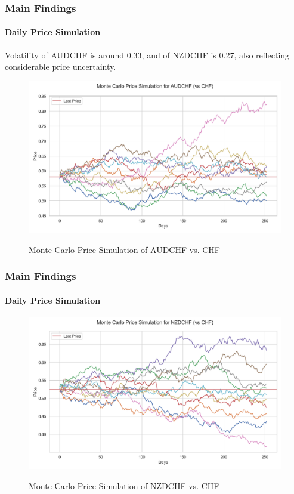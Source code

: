 \documentclass[10pt]{beamer}
\begin{document}
\begin{frame}
\frametitle{Main Findings}
\framesubtitle{Daily Price Simulation}
Volatility of AUDCHF is around 0.33, and of NZDCHF is 0.27, also reflecting considerable price uncertainty.
\begin{figure}[h]
    \centering \includegraphics[width=0.9\linewidth]{../../reports/figures/monte_carlo_price_simulation_AUDCHF_vs_CHF.png}    \label{fig:monte_carlo_price_simulation_AUDCHF_vs_CHF}
    \caption{Monte Carlo Price Simulation of AUDCHF vs. CHF}
\end{figure}
\end{frame}
\begin{frame}
\frametitle{Main Findings}
\framesubtitle{Daily Price Simulation}
\begin{figure}[h]
    \centering  \includegraphics[width=0.9\linewidth]{../../reports/figures/monte_carlo_price_simulation_NZDCHF_vs_CHF.png}  \label{fig:monte_carlo_price_simulation_NZDCHF_vs_CHF}
    \caption{Monte Carlo Price Simulation of NZDCHF vs. CHF}
\end{figure}
\end{frame}
\end{document}

